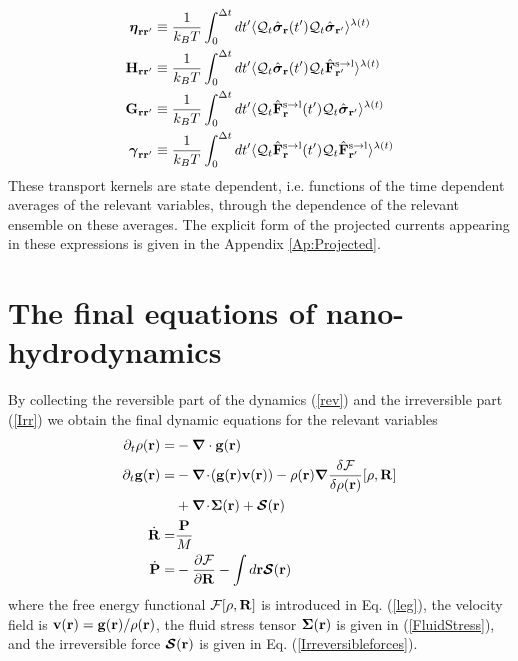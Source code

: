 \documentclass[b5paper,openright,11pt]{book}
\newcommand{\esc}{\!\cdot\!}
\begin{document}
\begin{align}
  \boldsymbol{\eta}_{{\bf  r}{\bf r}'} &\equiv
\frac{1}{k_BT}\int_0^{\Delta t} dt'\langle 
{\cal Q}_t\hat{\boldsymbol{\sigma}}_{{\bf r}}(t')
{\cal Q}_t\hat{\boldsymbol{\sigma}}_{{\bf r}'}\rangle^{\lambda(t)}
\nonumber\\
{\bf H}_{{\bf r}{\bf r}'}&\equiv\frac{1}{k_BT}\int_0^{\Delta t} dt'
\langle {\cal Q}_t\hat{\boldsymbol{\sigma}}_{{\bf r}}(t')
{\cal Q}_t\hat{\bf F}^{\rm s\to l}_{{\bf r}'}\rangle^{\lambda(t)}
\nonumber\\
{\bf G}_{{\bf r}{\bf r}'}&\equiv\frac{1}{k_BT}\int_0^{\Delta t} dt'
\langle {\cal Q}_t\hat{\bf F}^{\rm s\to l}_{{\bf r}}(t')
{\cal Q}_t\hat{\boldsymbol{\sigma}}_{{\bf r}'}\rangle^{\lambda(t)}
\nonumber\\
\boldsymbol{\gamma}_{{\bf  r}{\bf r}'}&\equiv\frac{1}{k_BT}\int_0^{\Delta t} dt'
\langle 
{\cal Q}_t\hat{\bf F}^{\rm s\to l}_{{\bf r}}(t')
{\cal Q}_t\hat{\bf F}^{\rm s\to l}_{{\bf r}'}\rangle^{\lambda(t)}
\label{GK}
\end{align}
These transport  kernels are state  dependent, i.e.  functions  of the
time  dependent  averages  of  the  relevant  variables,  through  the
dependence of  the relevant ensemble  on these averages.  The explicit
form of the projected currents appearing in these expressions is given
in the Appendix \ref{Ap:Projected}.

\section{The final equations of nano-hydrodynamics} 
By collecting the reversible part  of the dynamics (\ref{rev}) and the
irreversible part  (\ref{Irr}) we  obtain the final  dynamic equations
for the relevant variables
\begin{align}
\partial_t\rho({\bf r})=&-\boldsymbol{\nabla}\cdot{\bf g}({\bf r})
\nonumber\\
\partial_t{\bf g}({\bf r})=&-\boldsymbol{\nabla}\esc{\left({\bf g}({\bf r}){\bf v}({\bf r})\right)}
-\rho({\bf r})\boldsymbol{\nabla}\frac{\delta {\cal F}}{\delta\rho({\bf r})}[\rho,{\bf R}]
\nonumber\\
&+\boldsymbol{\nabla}\esc\boldsymbol{\Sigma}({\bf r})+\boldsymbol{{\cal S}}({\bf r})
\nonumber\\
\dot{\bf R}=&\frac{\bf P}{M}
\nonumber\\
\dot{\bf P}=&-\frac{\partial {\cal F}}{\partial {\bf R}}
-\int d {{\bf r}}\boldsymbol{{\cal S}}({\bf r})
\label{finaleq}
\end{align}
where  the   free  energy  functional  ${\cal   F}[\rho,{\bf  R}]$  is
introduced  in  Eq. (\ref{leg}),  the  velocity  field is  ${\bf  v}({\bf
  r})={\bf  g}({\bf  r})/\rho({\bf  r})$,   the  fluid  stress  tensor
$\boldsymbol{\Sigma}({\bf  r})$ is  given in  (\ref{FluidStress}), and
the irreversible  force $\boldsymbol{{\cal  S}}({\bf r})$ is  given in
Eq. (\ref{Irreversibleforces}).
\end{document}
